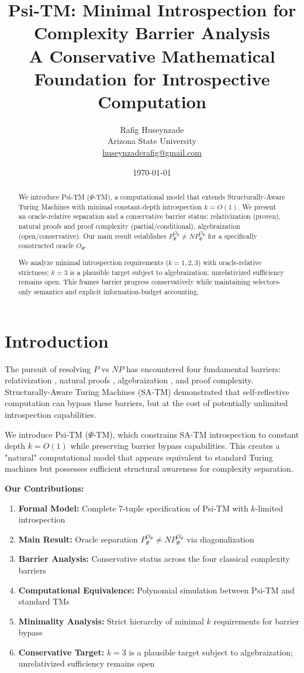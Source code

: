 \documentclass[11pt]{article}
\title{Psi-TM: Minimal Introspection for Complexity Barrier Analysis\\
\large{A Conservative Mathematical Foundation for Introspective Computation}}
\author{Rafig Huseynzade\\
Arizona State University\\
\href{mailto:huseynzaderafig@gmail.com}{huseynzaderafig@gmail.com}}
\date{\today}
\theoremstyle{definition}
\begin{document}
\maketitle

\begin{abstract}
We introduce Psi-TM ($\Psi$-TM), a computational model that extends Structurally-Aware Turing Machines with minimal constant-depth introspection $k = O(1)$. We present an oracle-relative separation and a conservative barrier status: relativization (proven), natural proofs and proof complexity (partial/conditional), algebraization (open/conservative). Our main result establishes $P^{O_\Psi}_\Psi \neq NP^{O_\Psi}_\Psi$ for a specifically constructed oracle $O_\Psi$.

We analyze minimal introspection requirements ($k=1,2,3$) with oracle-relative strictness; $k=3$ is a plausible target subject to algebraization; unrelativized sufficiency remains open. This frames barrier progress conservatively while maintaining selectors-only semantics and explicit information-budget accounting.
\end{abstract}

\tableofcontents
\newpage

\section{Introduction}

The pursuit of resolving $P$ vs $NP$ has encountered four fundamental barriers: relativization \cite{BGS75}, natural proofs \cite{RR97}, algebraization \cite{AW09}, and proof complexity. Structurally-Aware Turing Machines (SA-TM) \cite{SA-TM} demonstrated that self-reflective computation can bypass these barriers, but at the cost of potentially unlimited introspection capabilities.

We introduce Psi-TM ($\Psi$-TM), which constrains SA-TM introspection to constant depth $k = O(1)$ while preserving barrier bypass capabilities. This creates a "natural" computational model that appears equivalent to standard Turing machines but possesses sufficient structural awareness for complexity separation.

\textbf{Our Contributions:}
\begin{enumerate}
\item \textbf{Formal Model:} Complete 7-tuple specification of Psi-TM with $k$-limited introspection
\item \textbf{Main Result:} Oracle separation $P^{O_\Psi}_\Psi \neq NP^{O_\Psi}_\Psi$ via diagonalization
\item \textbf{Barrier Analysis:} Conservative status across the four classical complexity barriers
\item \textbf{Computational Equivalence:} Polynomial simulation between Psi-TM and standard TMs
\item \textbf{Minimality Analysis:} Strict hierarchy of minimal $k$ requirements for barrier bypass
\item \textbf{Conservative Target:} $k=3$ is a plausible target subject to algebraization; unrelativized sufficiency remains open
\end{enumerate}
\end{document}

